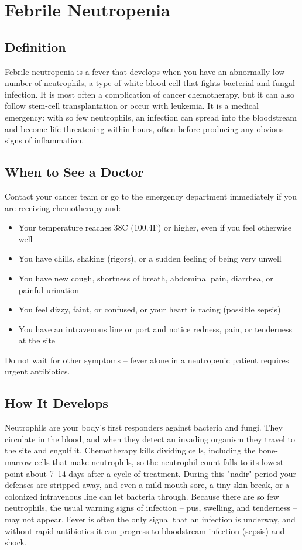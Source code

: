 \chapter{Febrile Neutropenia}

\section*{Definition}
Febrile neutropenia is a fever that develops when you have an abnormally low number of neutrophils, a type of white blood cell that fights bacterial and fungal infection. It is most often a complication of cancer chemotherapy, but it can also follow stem-cell transplantation or occur with leukemia. It is a medical emergency: with so few neutrophils, an infection can spread into the bloodstream and become life-threatening within hours, often before producing any obvious signs of inflammation.

\section*{When to See a Doctor}
Contact your cancer team or go to the emergency department immediately if you are receiving chemotherapy and:
\begin{itemize}
  \item Your temperature reaches 38\textdegree{}C (100.4\textdegree{}F) or higher, even if you feel otherwise well
  \item You have chills, shaking (rigors), or a sudden feeling of being very unwell
  \item You have new cough, shortness of breath, abdominal pain, diarrhea, or painful urination
  \item You feel dizzy, faint, or confused, or your heart is racing (possible sepsis)
  \item You have an intravenous line or port and notice redness, pain, or tenderness at the site
\end{itemize}
Do not wait for other symptoms -- fever alone in a neutropenic patient requires urgent antibiotics.

\section*{How It Develops}
Neutrophils are your body's first responders against bacteria and fungi. They circulate in the blood, and when they detect an invading organism they travel to the site and engulf it. Chemotherapy kills dividing cells, including the bone-marrow cells that make neutrophils, so the neutrophil count falls to its lowest point about 7--14 days after a cycle of treatment. During this "nadir" period your defenses are stripped away, and even a mild mouth sore, a tiny skin break, or a colonized intravenous line can let bacteria through. Because there are so few neutrophils, the usual warning signs of infection -- pus, swelling, and tenderness -- may not appear. Fever is often the only signal that an infection is underway, and without rapid antibiotics it can progress to bloodstream infection (sepsis) and shock.

